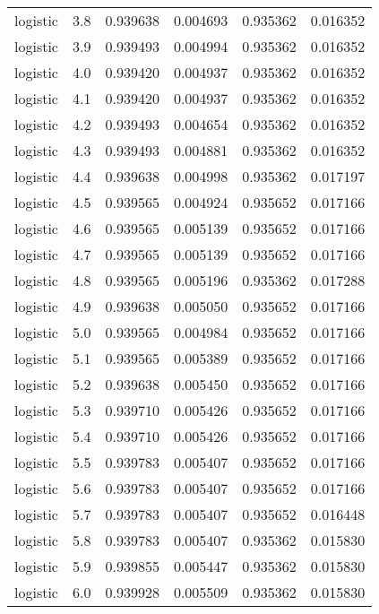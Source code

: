 \begin{tabular}{lrrrrr}
logistic &        3.8 &    0.939638 &   0.004693 &   0.935362 &  0.016352 \\
logistic &        3.9 &    0.939493 &   0.004994 &   0.935362 &  0.016352 \\
logistic &        4.0 &    0.939420 &   0.004937 &   0.935362 &  0.016352 \\
logistic &        4.1 &    0.939420 &   0.004937 &   0.935362 &  0.016352 \\
logistic &        4.2 &    0.939493 &   0.004654 &   0.935362 &  0.016352 \\
logistic &        4.3 &    0.939493 &   0.004881 &   0.935362 &  0.016352 \\
logistic &        4.4 &    0.939638 &   0.004998 &   0.935362 &  0.017197 \\
logistic &        4.5 &    0.939565 &   0.004924 &   0.935652 &  0.017166 \\
logistic &        4.6 &    0.939565 &   0.005139 &   0.935652 &  0.017166 \\
logistic &        4.7 &    0.939565 &   0.005139 &   0.935652 &  0.017166 \\
logistic &        4.8 &    0.939565 &   0.005196 &   0.935362 &  0.017288 \\
logistic &        4.9 &    0.939638 &   0.005050 &   0.935652 &  0.017166 \\
logistic &        5.0 &    0.939565 &   0.004984 &   0.935652 &  0.017166 \\
logistic &        5.1 &    0.939565 &   0.005389 &   0.935652 &  0.017166 \\
logistic &        5.2 &    0.939638 &   0.005450 &   0.935652 &  0.017166 \\
logistic &        5.3 &    0.939710 &   0.005426 &   0.935652 &  0.017166 \\
logistic &        5.4 &    0.939710 &   0.005426 &   0.935652 &  0.017166 \\
logistic &        5.5 &    0.939783 &   0.005407 &   0.935652 &  0.017166 \\
logistic &        5.6 &    0.939783 &   0.005407 &   0.935652 &  0.017166 \\
logistic &        5.7 &    0.939783 &   0.005407 &   0.935652 &  0.016448 \\
logistic &        5.8 &    0.939783 &   0.005407 &   0.935362 &  0.015830 \\
logistic &        5.9 &    0.939855 &   0.005447 &   0.935362 &  0.015830 \\
logistic &        6.0 &    0.939928 &   0.005509 &   0.935362 &  0.015830 \\

\end{tabular}
